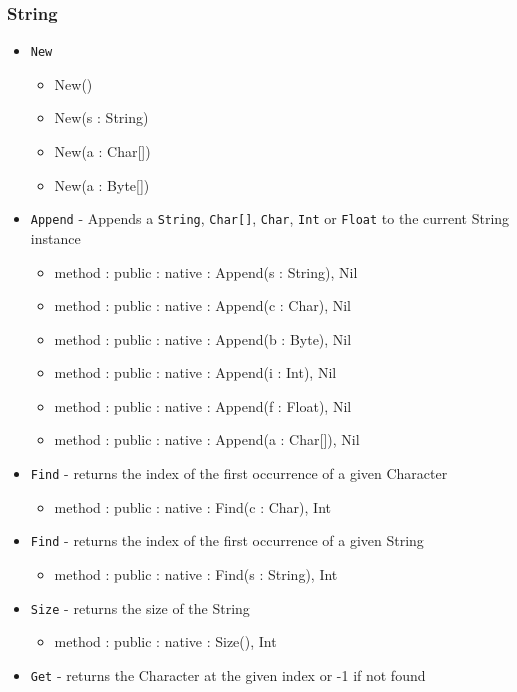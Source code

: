 \documentclass[12pt]{article}
\begin{document}
\subsubsection{String}
\begin{itemize}
    \item \texttt{New} 
    	\begin{itemize}
	\item New()
	\item New(s : String)
	\item New(a : Char[])
	\item New(a : Byte[])
	\end{itemize}
    \item \texttt{Append} - Appends a \texttt{String}, \texttt{Char[]}, \texttt{Char}, \texttt{Int} or \texttt{Float} to the current String instance
    	\begin{itemize}
	\item method : public : native : Append(s : String), Nil
	\item method : public : native : Append(c : Char), Nil
	\item method : public : native : Append(b : Byte), Nil
	\item method : public : native : Append(i : Int), Nil
	\item method : public : native : Append(f : Float), Nil
	\item method : public : native : Append(a : Char[]), Nil
	\end{itemize}
    \item \texttt{Find} - returns the index of the first occurrence of a given Character
    	\begin{itemize}
	\item method : public : native : Find(c : Char), Int
	\end{itemize}
     \item \texttt{Find} - returns the index of the first occurrence of a given String
    	\begin{itemize}
	\item method : public : native : Find(s : String), Int
	\end{itemize}
    \item \texttt{Size} - returns the size of the String
    	\begin{itemize}
	\item method : public : native : Size(), Int
	\end{itemize}
     \item \texttt{Get} - returns the Character at the given index or -1 if not found

\end{itemize}
\end{document}
